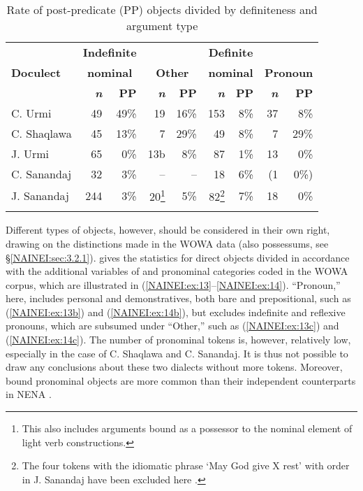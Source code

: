 \documentclass[output=paper,colorlinks,citecolor=brown,draftmode]{langscibook}
\begin{document}
\begin{table}[b]
        \begin{tabular}{lrrrrrrrr}
\lsptoprule
& \multicolumn{2}{c}{\textbf{Indefinite}} & & & \multicolumn{2}{c}{\textbf{Definite}} & &  \\
\textbf{Doculect} & \multicolumn{2}{c}{\textbf{nominal}} & \multicolumn{2}{c}{\textbf{Other}} & \multicolumn{2}{c}{\textbf{nominal}} & \multicolumn{2}{c}{\textbf{Pronoun}}  \\
 \cmidrule(lr){2-3}\cmidrule(lr){4-5}\cmidrule(lr){6-7}\cmidrule(lr){8-9}
 & \textbf{\textit{n}} & \textbf{PP} & \textbf{\textit{n}} & \textbf{PP} & \textbf{\textit{n}} & \textbf{PP} & \textit{\textbf{n}} & \textbf{PP} \\
\midrule
C. Urmi & 49 & 49\% & 19 & 16\% & 153 & 8\% & 37 & 8\% \\
C. Shaqlawa & 45 & 13\% & 7 & 29\% & 49 & 8\% & 7 & 29\% \\
J. Urmi & 65 & 0\% & 13b & 8\% & 87 & 1\% & 13 & 0\% \\
C. Sanandaj & 32 & 3\% & – & – & 18 & 6\% & (1 & 0\%) \\
J. Sanandaj & 244 & 3\% & 20\parbox{0mm}{\footnote{This also includes arguments bound as a possessor to the nominal element of light verb constructions.}} & 5\% & 82\parbox{0mm}{\footnote{The four tokens with the idiomatic phrase `May God give X rest' with  order in J. Sanandaj have been excluded here \parencite[see][]{NoorlanderMolin2022WordOrder}.}} & 7\% & 18 & 0\% \\
\lspbottomrule
    \end{tabular}
    \caption{Rate of post-predicate (PP) objects divided by definiteness and argument type}
    \label{NAINEI:tab:4}
\end{table}


Different types of objects, however, should be considered in their own right, drawing on the distinctions made in the WOWA data (also possessums, see §\ref{NAINEI:sec:3.2.1}).  gives the statistics for direct objects divided in accordance with the additional variables of  and pronominal categories coded in the WOWA corpus, which are illustrated in (\ref{NAINEI:ex:13}--\ref{NAINEI:ex:14}). ``Pronoun,'' here, includes personal and demonstratives, both bare and prepositional, such as (\ref{NAINEI:ex:13b}) and (\ref{NAINEI:ex:14b}), but excludes indefinite and reflexive pronouns, which are subsumed under ``Other,'' such as (\ref{NAINEI:ex:13c}) and (\ref{NAINEI:ex:14c}). The number of pronominal tokens is, however, relatively low, especially in the case of C. Shaqlawa and C. Sanandaj. It is thus not possible to draw any conclusions about these two dialects without more tokens. Moreover, bound pronominal objects are more common than their independent counterparts in NENA \parencite[see][]{NoorlanderMolin2022WordOrder}.
\end{document}
